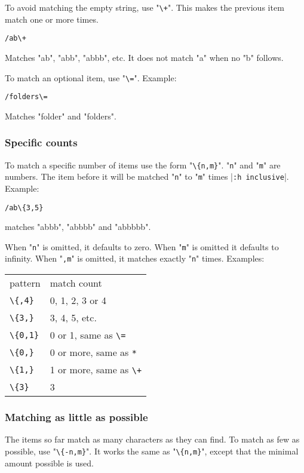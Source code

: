 To avoid matching the empty string, use "\verb!\+!".
This makes the previous item match one or more times.

\begin{Verbatim}[samepage=true]
 /ab\+
\end{Verbatim}

Matches "ab", "abb", "abbb", etc.
It does not match "a" when no "b" follows.

To match an optional item, use "\verb!\=!".
Example:

\begin{Verbatim}[samepage=true]
 /folders\=
\end{Verbatim}

Matches "folder" and "folders".
\subsubsection{Specific counts}
To match a specific number of items use the form "\verb!\{n,m}!".
"\verb!n!" and "\verb!m!" are numbers.
The item before it will be matched "\verb!n!" to "\verb!m!" times |\verb!:h inclusive!|.
Example:

\begin{Verbatim}[samepage=true]
 /ab\{3,5}
\end{Verbatim}

matches "abbb", "abbbb" and "abbbbb".

When "\verb!n!" is omitted, it defaults to zero.
When "\verb!m!" is omitted it defaults to infinity.
When "\verb!,m!" is omitted, it matches exactly "\verb!n!" times.
Examples:

\begin{center} \begin{tabular}{l l}
				pattern & match count \\
				\verb!\{,4}! & 0, 1, 2, 3 or 4 \\
				\verb!\{3,}! & 3, 4, 5, etc. \\
				\verb!\{0,1}! & 0 or 1, same as \verb!\=! \\
				\verb!\{0,}! & 0 or more, same as \verb!*! \\
				\verb!\{1,}! & 1 or more, same as \verb!\+! \\
				\verb!\{3}! & 3 \\
\end{tabular} \end{center}
\subsubsection{Matching as little as possible}
The items so far match as many characters as they can find.
To match as few as possible, use "\verb!\{-n,m}!".
It works the same as "\verb!\{n,m}!", except that the minimal amount possible is used.


